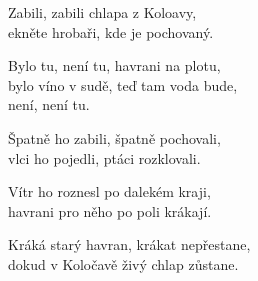 
\ve{}
Zabili, zabili chlapa z Koloavy,\\
ekněte hrobaři, kde je pochovaný.

\cho{}
Bylo tu, není tu, havrani na plotu,\\
bylo víno v sudě, teď tam voda bude,\\
není, není tu.

\ve{}
Špatně ho zabili, špatně pochovali,\\
vlci ho pojedli, ptáci rozklovali.

\cho{}

\ve{}
Vítr ho roznesl po dalekém kraji,\\
havrani pro něho po poli krákají.

\cho{}

\ve{}
Kráká starý havran, krákat nepřestane,\\
dokud v Koločavě živý chlap zůstane.

\esong{}